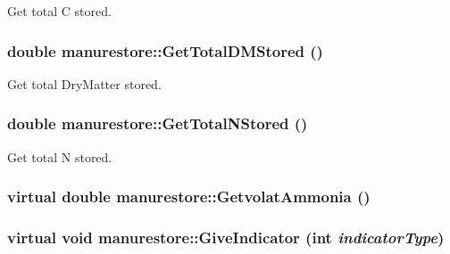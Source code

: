 \label{classmanurestore_a1594e166fa24b3c783dd902f8e4d78bb}
Get total C stored. \hypertarget{classmanurestore_a1c140a30a254928321fcbe43b7f15955}{
\subsubsection[{GetTotalDMStored}]{\setlength{\rightskip}{0pt plus 5cm}double manurestore::GetTotalDMStored ()}}
\label{classmanurestore_a1c140a30a254928321fcbe43b7f15955}
Get total DryMatter stored. \hypertarget{classmanurestore_ac6e20f11b514cdf0794ea7d7cddcb438}{
\subsubsection[{GetTotalNStored}]{\setlength{\rightskip}{0pt plus 5cm}double manurestore::GetTotalNStored ()}}
\label{classmanurestore_ac6e20f11b514cdf0794ea7d7cddcb438}
Get total N stored. \hypertarget{classmanurestore_a87790b2d408734bf0c3d800fb3ec9157}{
\subsubsection[{GetvolatAmmonia}]{\setlength{\rightskip}{0pt plus 5cm}virtual double manurestore::GetvolatAmmonia ()}}
\label{classmanurestore_a87790b2d408734bf0c3d800fb3ec9157}
\hypertarget{classmanurestore_a0e71b577a0d53a31588784dd56c9b935}{
\subsubsection[{GiveIndicator}]{\setlength{\rightskip}{0pt plus 5cm}virtual void manurestore::GiveIndicator (int {\em indicatorType})}}
\label{classmanurestore_a0e71b577a0d53a31588784dd56c9b935}


